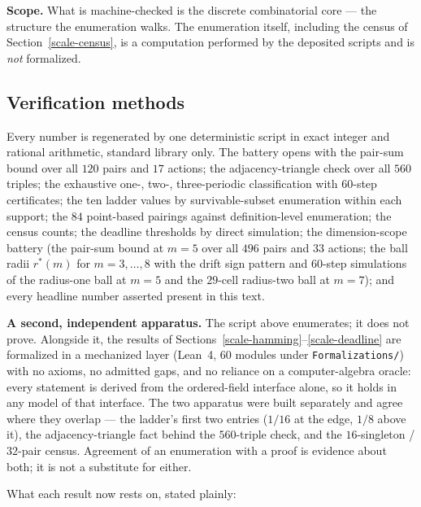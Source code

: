 \documentclass[10pt,twocolumn]{article}
\theoremstyle{plain}
\theoremstyle{definition}
\theoremstyle{remark}
\begin{document}
\noindent\textbf{Scope.} What is machine-checked is the discrete combinatorial core --- the
structure the enumeration walks. The enumeration itself, including the census of
Section~\ref{scale-census}, is a computation performed by the deposited scripts and is
\emph{not} formalized.

\subsection{Verification methods}\label{scale-methods}

Every number is regenerated by one deterministic script in exact integer and rational arithmetic, standard library only. The battery opens with the pair-sum bound over all \(120\) pairs and \(17\) actions; the
adjacency-triangle check over all \(560\) triples; the exhaustive
one-, two-, three-periodic classification with \(60\)-step
certificates; the ten ladder values by survivable-subset enumeration
within each support; the \(84\) point-based pairings against
definition-level enumeration; the census counts; the deadline
thresholds by direct simulation; the dimension-scope battery (the
pair-sum bound at \(m = 5\) over all \(496\) pairs and \(33\)
actions; the ball radii \(r^{*}(m)\) for \(m = 3, \dots, 8\) with
the drift sign pattern and \(60\)-step simulations of the radius-one
ball at \(m = 5\) and the \(29\)-cell radius-two ball at
\(m = 7\)); and every headline number asserted present in this
text.

\textbf{A second, independent apparatus.} The script above enumerates;
it does not prove. Alongside it, the results of
Sections~\ref{scale-hamming}--\ref{scale-deadline} are formalized in a mechanized
layer (Lean~4, 60 modules under \texttt{Formalizations/}) with no axioms, no admitted
gaps, and no reliance on a computer-algebra oracle: every statement is
derived from the ordered-field interface alone, so it holds in any
model of that interface. The two apparatus were built separately and
agree where they overlap --- the ladder's first two entries
(\(1/16\) at the edge, \(1/8\) above it), the
adjacency-triangle fact behind the \(560\)-triple check, and the
\(16\)-singleton / \(32\)-pair census. Agreement of an enumeration
with a proof is evidence about both; it is not a substitute for either.

What each result now rests on, stated plainly:
\end{document}
